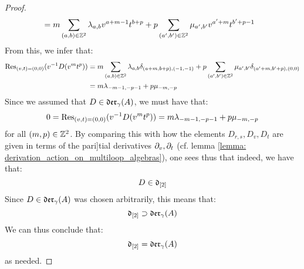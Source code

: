 \begin{proof}
$$\begin{aligned}
                            & = m \sum_{(a, b) \in \mathbb{Z}^2} \lambda_{a, b} v^{a + m - 1} t^{b + p} + p \sum_{(a', b') \in \mathbb{Z}^2} \mu_{a', b'} v^{a' + m} t^{b' + p - 1}
                        \end{aligned}
                    $$
                From this, we infer that:
                    $$
                        \begin{aligned}
                            \mathrm{Res}_{(v, t) = (0, 0)}( v^{-1} D(v^m t^p) ) & = m \sum_{(a, b) \in \mathbb{Z}^2} \lambda_{a, b} \delta_{(a + m, b + p), (-1, -1)} + p \sum_{(a', b') \in \mathbb{Z}^2} \mu_{a', b'} \delta_{(a' + m, b' + p), (0, 0)}
                            \\
                            & = m \lambda_{-m - 1, -p - 1} + p \mu_{-m, -p}
                        \end{aligned}
                    $$
                Since we assumed that $D \in \mathfrak{der}_{\gamma}(A)$, we must have that:
                    $$0 = \mathrm{Res}_{(v, t) = (0, 0)}( v^{-1} D(v^m t^p) ) = m \lambda_{-m - 1, -p - 1} + p \mu_{-m, -p}$$
                for all $(m, p) \in \mathbb{Z}^2$. By comparing this with how the elements $D_{r, s}, D_v, D_t$ are given in terms of the pari]tial derivatives $\partial_v, \partial_t$ (cf. lemma \ref{lemma: derivation_action_on_multiloop_algebras}), one sees thus that indeed, we have that:
                    $$D \in \mathfrak{d}_{[2]}$$
                Since $D \in \mathfrak{der}_{\gamma}(A)$ was chosen arbitrarily, this means that:
                    $$\mathfrak{d}_{[2]} \supset \mathfrak{der}_{\gamma}(A)$$
                We can thus conclude that:
                    $$\mathfrak{d}_{[2]} = \mathfrak{der}_{\gamma}(A)$$
                as needed.
            \end{proof}
    

